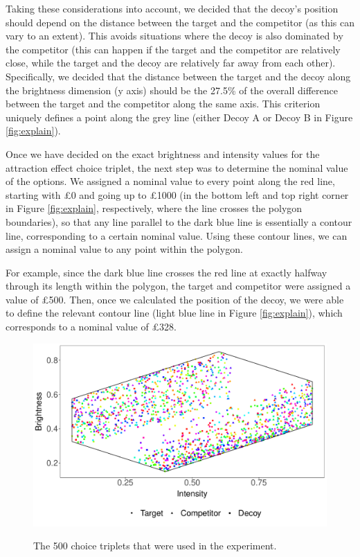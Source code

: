 \documentclass[11pt,a4paper]{article}
\begin{document}
Taking these considerations into account, we decided that the decoy's position should depend on the distance between the target and the competitor (as this can vary to an extent). This avoids situations where the decoy is also dominated by the competitor (this can happen if the target and the competitor are relatively close, while the target and the decoy are relatively far away from each other). Specifically, we decided that the distance between the target and the decoy along the brightness dimension (y axis) should be the 27.5\% of the overall difference between the target and the competitor along the same axis. This criterion uniquely defines a point along the grey line (either Decoy A or Decoy B in Figure \ref{fig:explain}).

Once we have decided on the exact brightness and intensity values for the attraction effect choice triplet, the next step was to determine the nominal value of the options. We assigned a nominal value to every point along the red line, starting with £0 and going up to £1000 (in the bottom left and top right corner in Figure \ref{fig:explain}, respectively, where the line crosses the polygon boundaries), so that any line parallel to the dark blue line is essentially a contour line, corresponding to a certain nominal value. Using these contour lines, we can assign a nominal value to any point within the polygon.

For example, since the dark blue line crosses the red line at exactly halfway through its length within the polygon, the target and competitor were assigned a value of £500. Then, once we calculated the position of the decoy, we were able to define the relevant contour line (light blue line in Figure \ref{fig:explain}), which corresponds to a nominal value of £328. 

\begin{figure}[!htb]
\centering
\caption{The 500 choice triplets that were used in the experiment.}
\includegraphics[width=1\textwidth]{./AE_teapots_Figure_2poly.pdf}
\label{fig:choice_sets}
\end{figure}
\end{document}

